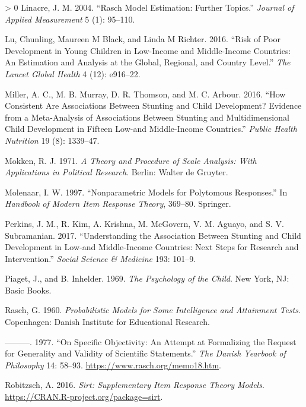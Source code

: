 \documentclass[
]{book}
\newlength{\cslhangindent}
\newenvironment{CSLReferences}[3] %
 {%
  \setlength{\parindent}{0pt}
  \ifodd #1 \everypar{\setlength{\hangindent}{\cslhangindent}}\ignorespaces\fi
  \ifnum #2 > 0
  \setlength{\parskip}{#2\baselineskip}
  \fi
 }%
 {}
\begin{document}
\begin{CSLReferences}{1}{0}
\leavevmode\hypertarget{ref-linacre2004}{}%
Linacre, J. M. 2004. {``Rasch Model Estimation: Further Topics.''} \emph{Journal of Applied Measurement} 5 (1): 95--110.

\leavevmode\hypertarget{ref-lu2016}{}%
Lu, Chunling, Maureen M Black, and Linda M Richter. 2016. {``Risk of Poor Development in Young Children in Low-Income and Middle-Income Countries: An Estimation and Analysis at the Global, Regional, and Country Level.''} \emph{The Lancet Global Health} 4 (12): e916--22.

\leavevmode\hypertarget{ref-miller2016consistent}{}%
Miller, A. C., M. B. Murray, D. R. Thomson, and M. C. Arbour. 2016. {``How Consistent Are Associations Between Stunting and Child Development? Evidence from a Meta-Analysis of Associations Between Stunting and Multidimensional Child Development in Fifteen Low-and Middle-Income Countries.''} \emph{Public Health Nutrition} 19 (8): 1339--47.

\leavevmode\hypertarget{ref-mokken1971}{}%
Mokken, R. J. 1971. \emph{A Theory and Procedure of Scale Analysis: With Applications in Political Research}. Berlin: Walter de Gruyter.

\leavevmode\hypertarget{ref-molenaar1997}{}%
Molenaar, I. W. 1997. {``Nonparametric Models for Polytomous Responses.''} In \emph{Handbook of Modern Item Response Theory}, 369--80. Springer.

\leavevmode\hypertarget{ref-perkins2017understanding}{}%
Perkins, J. M., R. Kim, A. Krishna, M. McGovern, V. M. Aguayo, and S. V. Subramanian. 2017. {``Understanding the Association Between Stunting and Child Development in Low-and Middle-Income Countries: Next Steps for Research and Intervention.''} \emph{Social Science \& Medicine} 193: 101--9.

\leavevmode\hypertarget{ref-piaget1969}{}%
Piaget, J., and B. Inhelder. 1969. \emph{The Psychology of the Child}. New York, NJ: Basic Books.

\leavevmode\hypertarget{ref-rasch1960}{}%
Rasch, G. 1960. \emph{Probabilistic Models for Some Intelligence and Attainment Tests}. Copenhagen: Danish Institute for Educational Research.

\leavevmode\hypertarget{ref-rasch1977}{}%
---------. 1977. {``On Specific Objectivity: An Attempt at Formalizing the Request for Generality and Validity of Scientific Statements.''} \emph{The Danish Yearbook of Philosophy} 14: 58--93. \url{https://www.rasch.org/memo18.htm}.

\leavevmode\hypertarget{ref-robitzsch2016}{}%
Robitzsch, A. 2016. \emph{Sirt: Supplementary Item Response Theory Models}. \url{https://CRAN.R-project.org/package=sirt}.


\end{CSLReferences}
\end{document}
